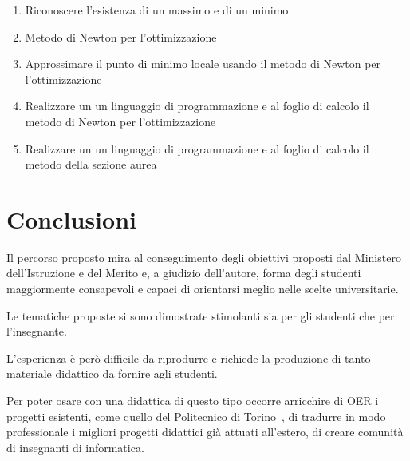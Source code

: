 \documentclass{easychair}
\begin{document}
\begin{enumerate}
  \item
  Riconoscere l'esistenza di un massimo e di un minimo
  \item
    Metodo di Newton per l'ottimizzazione
  \item
    Approssimare il punto di minimo locale usando il metodo di Newton
  per l'ottimizzazione
  \item
    Realizzare un un linguaggio di programmazione e al foglio di calcolo
  il metodo di Newton per l'ottimizzazione
  \item
    Realizzare un un linguaggio di programmazione e al foglio di calcolo
  il metodo della sezione aurea
\end{enumerate}
  
\section{Conclusioni}

Il percorso proposto mira al conseguimento degli obiettivi proposti dal Ministero
dell'Istruzione e del Merito e, a giudizio dell'autore, forma degli studenti
maggiormente consapevoli e capaci di orientarsi meglio nelle scelte universitarie.

Le tematiche proposte si sono dimostrate stimolanti sia per gli studenti che per
l'insegnante.

L'esperienza è però difficile da riprodurre e richiede la produzione di tanto materiale
didattico da fornire agli studenti. 

Per poter osare con una didattica di questo tipo occorre arricchire di OER i progetti
esistenti, come quello del Politecnico di Torino~\cite{fare}, di tradurre in modo
professionale i migliori progetti didattici già attuati all'estero, di creare
comunità di insegnanti di informatica.

\label{sect:bib}

%
%
%

\end{document}
